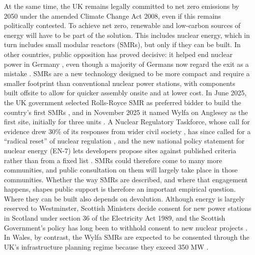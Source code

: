 \documentclass[a4paper, 11pt]{article}
\begin{document}
At the same time, the UK remains legally committed to net zero emissions by 2050 under the amended Climate Change Act 2008, even if this remains politically contested. To achieve net zero, renewable and low-carbon sources of energy will have to be part of the solution. This includes nuclear energy, which in turn includes small modular reactors (SMRs), but only if they can be built. In other countries, public opposition has proved decisive: it helped end nuclear power in Germany \citep{rudig2000,schreurs2012}, even though a majority of Germans now regard the exit as a mistake \citep{sinus2026}. SMRs are a new technology designed to be more compact and require a smaller footprint than conventional nuclear power stations, with components built offsite to allow for quicker assembly onsite and at lower cost. In June 2025, the UK government selected Rolls-Royce SMR as preferred bidder to build the country's first SMRs \citep{ans2025,jones2026}, and in November 2025 it named Wylfa on Anglesey as the first site, initially for three units \citep{sutton2025}. A Nuclear Regulatory Taskforce, whose call for evidence drew 30\% of its responses from wider civil society \citep{taskforce2025cfe}, has since called for a ``radical reset'' of nuclear regulation \citep{taskforce2025}, and the new national policy statement for nuclear energy (EN-7) lets developers propose sites against published criteria rather than from a fixed list \citep{desnz2025en7}. SMRs could therefore come to many more communities, and public consultation on them will largely take place in those communities. Whether the way SMRs are described, and where that engagement happens, shapes public support is therefore an important empirical question. Where they can be built also depends on devolution. Although energy is largely reserved to Westminster, Scottish Ministers decide consent for new power stations in Scotland under section 36 of the Electricity Act 1989, and the Scottish Government's policy has long been to withhold consent to new nuclear projects \citep{heffron2017,scotgov2023,desnz2026anf}. In Wales, by contrast, the Wylfa SMRs are expected to be consented through the UK's infrastructure planning regime because they exceed 350 MW \citep{sutton2025}.
\end{document}
